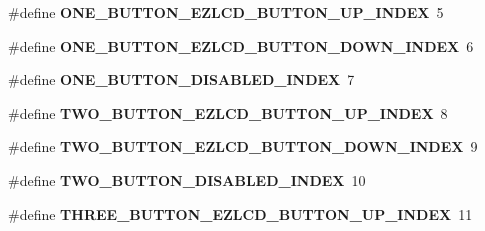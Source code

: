 \begin{DoxyCompactItemize}
\item 
\hypertarget{group__ez_l_c_d__103__user__config_gad4376c2d4a8e0a5ffe8334a5bffb7d3e}{\#define {\bfseries O\-N\-E\-\_\-\-B\-U\-T\-T\-O\-N\-\_\-\-E\-Z\-L\-C\-D\-\_\-\-B\-U\-T\-T\-O\-N\-\_\-\-U\-P\-\_\-\-I\-N\-D\-E\-X}~5}\label{group__ez_l_c_d__103__user__config_gad4376c2d4a8e0a5ffe8334a5bffb7d3e}

\item 
\hypertarget{group__ez_l_c_d__103__user__config_gaaa25c4e6f660bda2e6a6f2b19021facf}{\#define {\bfseries O\-N\-E\-\_\-\-B\-U\-T\-T\-O\-N\-\_\-\-E\-Z\-L\-C\-D\-\_\-\-B\-U\-T\-T\-O\-N\-\_\-\-D\-O\-W\-N\-\_\-\-I\-N\-D\-E\-X}~6}\label{group__ez_l_c_d__103__user__config_gaaa25c4e6f660bda2e6a6f2b19021facf}

\item 
\hypertarget{group__ez_l_c_d__103__user__config_ga3760bdf728cf046c7b02bf88b185c585}{\#define {\bfseries O\-N\-E\-\_\-\-B\-U\-T\-T\-O\-N\-\_\-\-D\-I\-S\-A\-B\-L\-E\-D\-\_\-\-I\-N\-D\-E\-X}~7}\label{group__ez_l_c_d__103__user__config_ga3760bdf728cf046c7b02bf88b185c585}

\item 
\hypertarget{group__ez_l_c_d__103__user__config_ga0725ac0952b70d04d7e110790373f50e}{\#define {\bfseries T\-W\-O\-\_\-\-B\-U\-T\-T\-O\-N\-\_\-\-E\-Z\-L\-C\-D\-\_\-\-B\-U\-T\-T\-O\-N\-\_\-\-U\-P\-\_\-\-I\-N\-D\-E\-X}~8}\label{group__ez_l_c_d__103__user__config_ga0725ac0952b70d04d7e110790373f50e}

\item 
\hypertarget{group__ez_l_c_d__103__user__config_ga75a4ee06288253e5977258263c4cea38}{\#define {\bfseries T\-W\-O\-\_\-\-B\-U\-T\-T\-O\-N\-\_\-\-E\-Z\-L\-C\-D\-\_\-\-B\-U\-T\-T\-O\-N\-\_\-\-D\-O\-W\-N\-\_\-\-I\-N\-D\-E\-X}~9}\label{group__ez_l_c_d__103__user__config_ga75a4ee06288253e5977258263c4cea38}

\item 
\hypertarget{group__ez_l_c_d__103__user__config_ga5abb9d345f5b8c2bde1975f79ada4eec}{\#define {\bfseries T\-W\-O\-\_\-\-B\-U\-T\-T\-O\-N\-\_\-\-D\-I\-S\-A\-B\-L\-E\-D\-\_\-\-I\-N\-D\-E\-X}~10}\label{group__ez_l_c_d__103__user__config_ga5abb9d345f5b8c2bde1975f79ada4eec}

\item 
\hypertarget{group__ez_l_c_d__103__user__config_ga1da2d6c7377a8b1536d7757bb2bb1a21}{\#define {\bfseries T\-H\-R\-E\-E\-\_\-\-B\-U\-T\-T\-O\-N\-\_\-\-E\-Z\-L\-C\-D\-\_\-\-B\-U\-T\-T\-O\-N\-\_\-\-U\-P\-\_\-\-I\-N\-D\-E\-X}~11}\label{group__ez_l_c_d__103__user__config_ga1da2d6c7377a8b1536d7757bb2bb1a21}


\end{DoxyCompactItemize}
